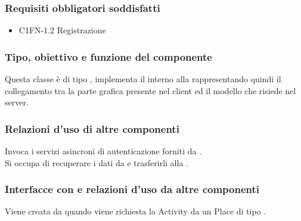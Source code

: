 \subsubsection*{Requisiti obbligatori soddisfatti}
\begin{itemize}
	\item C1FN-1.2 Registrazione
\end{itemize}
\subsubsection*{Tipo, obiettivo e funzione del componente}
Questa classe \`e di tipo , implementa il 
interno alla  rappresentando quindi il collegamento tra la parte
grafica presente nel client ed il modello che risiede nel server.
\subsubsection*{Relazioni d'uso di altre componenti} Invoca i servizi
asincroni di autenticazione forniti da .\\ Si occupa di
recuperare i dati da  e trasferirli alla . 
\subsubsection*{Interfacce con e relazioni d'uso da altre componenti} 
Viene creata da  quando viene richiesta la Activity da
un Place di tipo .
